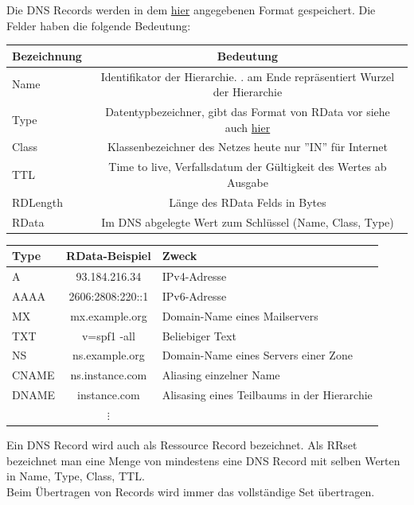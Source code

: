 \documentclass[a4paper,12pt,leqno]{article}
\begin{document}
Die DNS Records werden in dem \hyperref[pic:DNS-Record]{hier} angegebenen Format gespeichert.
Die Felder haben die folgende Bedeutung:\\

\begin{tabular}{|l|c|}
\hline
Bezeichnung & Bedeutung\\
\hline
Name & Identifikator der Hierarchie. . am Ende repräsentiert Wurzel der Hierarchie\\
Type & Datentypbezeichner, gibt das Format von RData vor siehe auch \hyperref[tab:RecordType]{hier}\\
Class & Klassenbezeichner des Netzes heute nur ''IN'' für Internet\\
\hline
TTL & Time to live, Verfallsdatum der Gültigkeit des Wertes ab Ausgabe\\
RDLength & Länge des RData Felds in Bytes\\
RData & Im DNS abgelegte Wert zum Schlüssel (Name, Class, Type)\\
\hline
\end{tabular}


{\label{tab:RecordType}
\begin{tabular}{|l|c|l|}
\hline
Type & RData-Beispiel & Zweck\\
\hline
A & 93.184.216.34 & IPv4-Adresse\\
AAAA & 2606:2808:220::1 & IPv6-Adresse\\
\hline
MX & mx.example.org & Domain-Name eines Mailservers\\
TXT & v=spf1 -all & Beliebiger Text\\
\hline
NS & ns.example.org & Domain-Name eines Servers einer Zone\\
CNAME & ns.instance.com & Aliasing einzelner Name\\
\hline
DNAME & instance.com & Alisasing eines Teilbaums in der Hierarchie\\
 & $\vdots$&\\
\hline
\end{tabular}
}

Ein DNS Record wird auch als Ressource Record bezeichnet. Als RRset bezeichnet man eine Menge von mindestens eine DNS Record mit selben Werten in Name, Type, Class, TTL.\\
Beim Übertragen von Records wird immer das vollständige Set übertragen.\\
\end{document}
